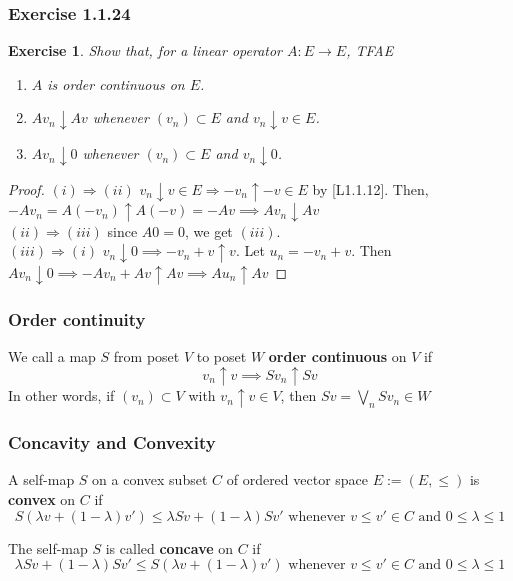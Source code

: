 \documentclass[11pt,xcolor={dvipsnames},hyperref={pdftex,pdfpagemode=UseNone,hidelinks,pdfdisplaydoctitle=true},usepdftitle=false]{beamer}
\newtheorem{exercise}{Exercise}[section]
\begin{document}
\begin{frame}
\frametitle{Exercise 1.1.24}
\begin{exercise}
Show that, for a linear operator $A : E \to E$, TFAE
\begin{enumerate}
\item[(i)] $A$ is order continuous on $E$.
\item[(ii)] $Av_n \downarrow Av$ whenever $(v_n) \subset E$ and $v_n \downarrow v \in E$.
\item[(iii)] $Av_n \downarrow 0$ whenever $(v_n) \subset E$ and $v_n \downarrow 0$.
\end{enumerate}
\end{exercise}

\begin{proof}
$(i)\Rightarrow (ii)$ $v_n\downarrow v\in E\Rightarrow -v_n\uparrow -v\in E$ by [L1.1.12]. Then,
$-Av_n = A(-v_n)\uparrow A(-v) = -Av \implies Av_n \downarrow Av$\\
$(ii)\Rightarrow(iii)$ since $A0=0$, we get $(iii)$.\\
$(iii)\Rightarrow(i)$ $v_n\downarrow 0\implies -v_n+v\uparrow v$. Let $u_n = -v_n+v$. Then $Av_n\downarrow 0 \implies -Av_n+Av \uparrow Av\implies Au_n\uparrow Av$
\end{proof}
\end{frame}
\begin{frame}
\frametitle{Order continuity}
\begin{definition}
We call a map $S$ from poset $V$ to poset $W$ \textbf{order continuous} on $V$ if
$$
v_n\uparrow v \implies Sv_n \uparrow Sv
$$
In other words, if $(v_n)\subset V$ with $v_n\uparrow v\in V$, then $Sv = \bigvee_n Sv_n \in W$
\end{definition}
\end{frame}
\begin{frame}
\frametitle{Concavity and Convexity}
\begin{definition}
A self-map $S$ on a convex subset $C$ of ordered vector space $E:=(E,\le)$ is \textbf{convex} on $C$ if
$$
S(\lambda v+(1-\lambda) v')\le \lambda Sv + (1-\lambda)Sv' \text{  whenever $v\le v'\in C$ and $0\le \lambda\le 1$}
$$

The self-map $S$ is called \textbf{concave} on $C$ if
$$
\lambda Sv + (1-\lambda)Sv'  \le S(\lambda v+(1-\lambda) v')\text{  whenever $v\le v'\in C$ and $0\le \lambda\le 1$}
$$
\end{definition}
\end{frame}
\end{document}
